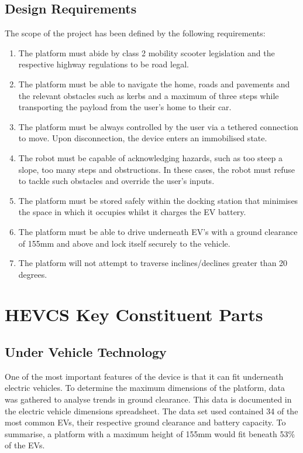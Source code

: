 \documentclass [12pt]{article}
\begin{document}
\subsection{Design Requirements}\label{sec:design_requirements}

The scope of the project has been defined by the following requirements:
\begin{enumerate}
    \item The platform must abide by class 2 mobility scooter legislation and the respective highway regulations to be road legal.
    \item The platform must be able to navigate the home, roads and pavements and the relevant obstacles such as kerbs and a maximum of three steps while transporting the payload from the user's home to their car.
    \item The platform must be always controlled by the user via a tethered connection to move. Upon disconnection, the device enters an immobilised state.
    \item The robot must be capable of acknowledging hazards, such as too steep a slope, too many steps and obstructions. In these cases, the robot must refuse to tackle such obstacles and override the user's inputs.
    \item The platform must be stored safely within the docking station that minimises the space in which it occupies whilst it charges the EV battery.
    \item The platform must be able to drive underneath EV's with a ground clearance of 155mm and above and lock itself securely to the vehicle.
    \item The platform will not attempt to traverse inclines/declines greater than 20 degrees.
  \end{enumerate}


\section{HEVCS Key Constituent Parts}\label{sec:constituent_parts}

\subsection{Under Vehicle Technology}

One of the most important features of the device is that it can fit underneath electric vehicles. To determine the maximum dimensions of the platform, data was gathered to analyse trends in ground clearance. This data is documented in the electric vehicle dimensions spreadsheet. The data set used contained 34 of the most common EVs, their respective ground clearance and battery capacity. To summarise, a platform with a maximum height of 155mm would fit beneath 53\% of the EVs. 
\end{document}
